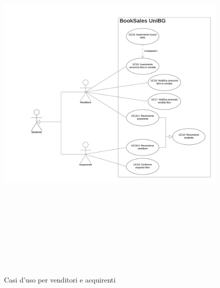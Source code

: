 \documentclass[10pt,a4paper]{article}
\begin{document}
	\begin{figure}[H]
		\centering
		\includegraphics[height=19cm, width=17cm, keepaspectratio]{sb_uc}
		\caption{Casi d'uso per venditori e acquirenti}
	\end{figure}
\end{document}
